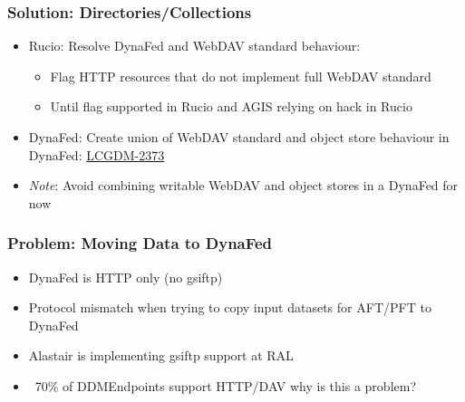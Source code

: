 \documentclass{beamer}
\begin{document}
\begin{frame}
  \frametitle{Solution: Directories/Collections}
  \begin{itemize}
    \item Rucio: Resolve DynaFed and WebDAV standard behaviour:
    \begin{itemize}
      \item Flag HTTP resources that do not implement full WebDAV standard
      \item Until flag supported in Rucio and AGIS relying on hack in Rucio
    \end{itemize}
    \item DynaFed: Create union of WebDAV standard and object store behaviour in DynaFed: \href{https://its.cern.ch/jira/browse/LCGDM-2373}{LCGDM-2373}
    \item \emph{Note}: Avoid combining writable WebDAV and object stores in a DynaFed for now
  \end{itemize}
\end{frame}

\begin{frame}
  \frametitle{Problem: Moving Data to DynaFed}
  \begin{itemize}
    \item DynaFed is HTTP only (no gsiftp)
    \item Protocol mismatch when trying to copy input datasets for AFT/PFT to DynaFed
    \item Alastair is implementing gsiftp support at RAL
    \item ~70\% of DDMEndpoints support HTTP/DAV why is this a problem?
  \end{itemize}
\end{frame}
\end{document}
